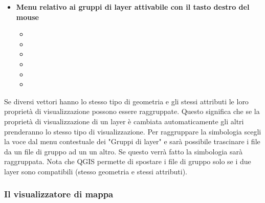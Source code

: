 \begin{itemize}
\item \textbf{Menu relativo ai gruppi di layer attivabile con il tasto destro del mouse} 
\begin{itemize}
\item {}
\item {}
\item {}
\item {}
\item {}
\item {}
\end{itemize}

\end{itemize}

Se diversi vettori hanno lo stesso tipo di geometria e gli stessi attributi le loro proprietà di visualizzazione
possono essere raggruppate. Questo significa che se la proprietà di visualizzazione di un
layer è cambiata automaticamente gli altri prenderanno lo stesso tipo di visualizzazione. Per raggruppare
la simbologia scegli la voce  dal menu contestuale dei "Gruppi di layer" e sarà
possibile trascinare i file da un file di gruppo ad un un altro. Se questo verrà fatto la simbologia sarà
raggruppata. Nota che QGIS permette di spostare i file di gruppo solo se i due layer sono compatibili
(stesso geometria e stessi attributi).

%

\subsubsection{Il visualizzatore di mappa}\label{label_mapview}

